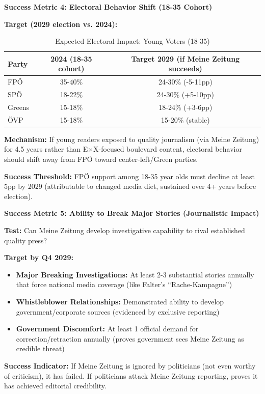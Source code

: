 \textbf{Success Metric 4: Electoral Behavior Shift (18-35 Cohort)}

\textbf{Target (2029 election vs. 2024):}

\begin{table}[h]
\centering
\caption{Expected Electoral Impact: Young Voters (18-35)}
\label{tab:dx-meine-zeitung-electoral}
\begin{tabular}{|l|c|c|}
\hline
\textbf{Party} & \textbf{2024 (18-35 cohort)} & \textbf{Target 2029 (if Meine Zeitung succeeds)} \\
\hline
FPÖ & 35-40\% & 24-30\% (-5-11pp) \\
SPÖ & 18-22\% & 24-30\% (+5-10pp) \\
Greens & 15-18\% & 18-24\% (+3-6pp) \\
ÖVP & 15-18\% & 15-20\% (stable) \\
\hline
\end{tabular}
\end{table}

\textbf{Mechanism:} If young readers exposed to quality journalism (via Meine Zeitung) for 4.5 years rather than
E×X-focused boulevard content, electoral behavior should shift away from FPÖ toward center-left/Green parties.

\textbf{Success Threshold:} FPÖ support among 18-35 year olds must decline at least 5pp by 2029
(attributable to changed media diet, sustained over 4+ years before election).

\textbf{Success Metric 5: Ability to Break Major Stories (Journalistic Impact)}

\textbf{Test:} Can Meine Zeitung develop investigative capability to rival established quality press?

\textbf{Target by Q4 2029:}

\begin{itemize}
\item \textbf{Major Breaking Investigations:} At least 2-3 substantial stories annually that force
  national media coverage (like Falter's ``Rache-Kampagne'')
\item \textbf{Whistleblower Relationships:} Demonstrated ability to develop government/corporate sources
  (evidenced by exclusive reporting)
\item \textbf{Government Discomfort:} At least 1 official demand for correction/retraction annually
  (proves government sees Meine Zeitung as credible threat)
\end{itemize}

\textbf{Success Indicator:} If Meine Zeitung is ignored by politicians (not even worthy of criticism), it has
failed. If politicians attack Meine Zeitung reporting, proves it has achieved editorial credibility.

